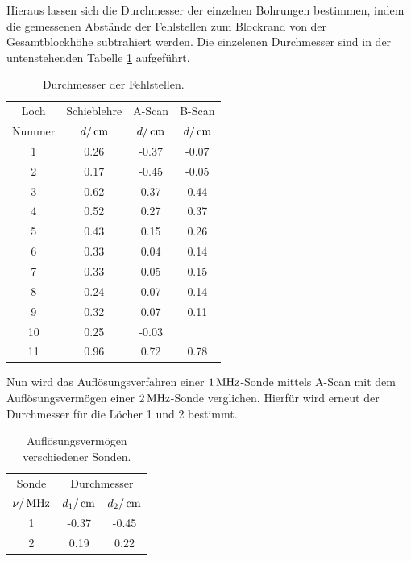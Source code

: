 \noindent Hieraus lassen sich die Durchmesser der einzelnen Bohrungen bestimmen, indem
die gemessenen Abstände der Fehlstellen zum Blockrand von der Gesamtblockhöhe
subtrahiert werden. Die einzelenen Durchmesser sind in der untenstehenden
Tabelle \ref{tab:durch} aufgeführt.
\begin{table}[H]
  \centering
  \begin{tabular}{cccc}
    \toprule
    \multicolumn{1}{c}{Loch}&\multicolumn{1}{c}{Schieblehre}&
    \multicolumn{1}{c}{A-Scan}&\multicolumn{1}{c}{B-Scan} \\
    Nummer & $d/\,\si{\centi\meter}$ & $d/\,\si{\centi\meter}$ & $d/\,\si{\centi\meter}$ \\
    \midrule
     1 & 0.26 & -0.37  &  -0.07      \\
     2 & 0.17 & -0.45  &  -0.05      \\
     3 & 0.62 &  0.37  &   0.44      \\
     4 & 0.52 &  0.27  &   0.37      \\
     5 & 0.43 &  0.15  &   0.26      \\
     6 & 0.33 &  0.04  &   0.14      \\
     7 & 0.33 &  0.05  &   0.15      \\
     8 & 0.24 &  0.07  &   0.14      \\
     9 & 0.32 &  0.07  &   0.11      \\
    10 & 0.25 & -0.03  &  \hrulefill \\
    11 & 0.96 &  0.72  &   0.78      \\
    \bottomrule
  \end{tabular}
  \caption{Durchmesser der Fehlstellen.}
  \label{tab:durch}
\end{table}
\noindent Nun wird das Auflösungsverfahren einer $1\,\si{\mega\hertz}$-Sonde mittels A-Scan mit dem
Auflösungsvermögen einer $2\,\si{\mega\hertz}$-Sonde verglichen. Hierfür wird erneut der
Durchmesser für die Löcher 1 und 2 bestimmt.
\begin{table}[H]
  \centering
  \begin{tabular}{ccc}
    \toprule
    \multicolumn{1}{c}{Sonde}&\multicolumn{2}{c}{Durchmesser}\\
    $\nu/\,\si{\mega\hertz}$ & $d_1/\,\si{\centi\meter}$ & $d_2/\,\si{\centi\meter}$ \\
    \midrule
    1  &  -0.37  &  -0.45 \\
    2  &   0.19  &   0.22 \\
    \bottomrule
  \end{tabular}
  \caption{Auflösungsvermögen verschiedener Sonden.}
  \label{tab:auf}
\end{table}
